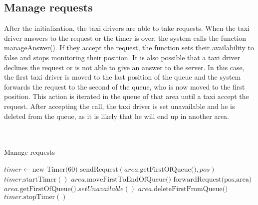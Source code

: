 			
			\newpage
				\subsection{Manage requests} After the initialization, the taxi drivers are able to take requests. When the taxi driver answers to the request or the timer is over, the system calls the function manageAnswer(). If they accept the request, the function sets their availability to false and stops monitoring their position. It is also possible that a taxi driver declines the request or is not able to give an answer to the server. In this case, the first taxi driver is moved to the last position of the queue and the system forwards the request to the second of the queue, who is now moved to the first position. This action is iterated in the queue of that area until a taxi accept the request. After accepting the call, the taxi driver is set unavailable and he is deleted from the queue, as it is likely that he will end up in another area.\\
			 \\\\
				\begin{algorithm}
					\caption{Manage requests}
					\begin{algorithmic}[1]
						\State $timer \gets \text{new Timer(60)}$
						\State $\text{sendRequest}(area.\text{getFirstOfQueue()}, pos)$
						\State $timer.\text{startTimer}()$
						\EndProcedure
							\State $area.\text{moveFirstToEndOfQueue()}$
							\State $\text{forwardRequest(pos,area)}$
						\EndIf
							\State $area.\text{getFirstOfQueue()}.setUnavailable()$
							\State $area.\text{deleteFirstFromQueue()}$
						\EndIf
						\State $timer.\text{stopTimer}()$
						\EndProcedure
					\end{algorithmic}
				\end{algorithm}
			
			\newpage
